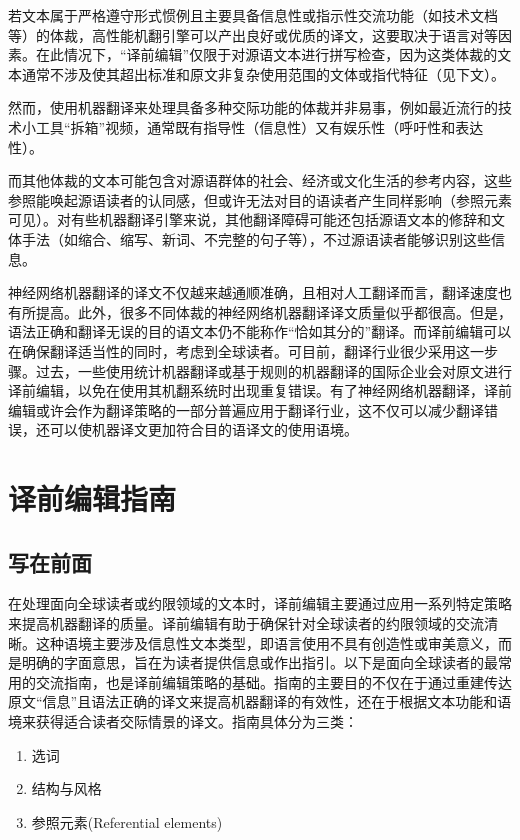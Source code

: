 \documentclass[output=paper,colorlinks,citecolor=brown]{langscibook}
\begin{document}
若文本属于严格遵守形式惯例且主要具备信息性或指示性交流功能（如技术文档等）的体裁，高性能机翻引擎可以产出良好或优质的译文，这要取决于语言对等因素。在此情况下，“译前编辑”仅限于对源语文本进行拼写检查，因为这类体裁的文本通常不涉及使其超出标准和原文非复杂使用范围的文体或指代特征（见下文）。

然而，使用机器翻译来处理具备多种交际功能的体裁并非易事，例如最近流行的技术小工具“拆箱”视频，通常既有指导性（信息性）又有娱乐性（呼吁性和表达性）。

而其他体裁的文本可能包含对源语群体的社会、经济或文化生活的参考内容，这些参照能唤起源语读者的认同感，但或许无法对目的语读者产生同样影响（参照元素可见）。对有些机器翻译引擎来说，其他翻译障碍可能还包括源语文本的修辞和文体手法（如缩合、缩写、新词、不完整的句子等），不过源语读者能够识别这些信息。

神经网络机器翻译的译文不仅越来越通顺准确，且相对人工翻译而言，翻译速度也有所提高。此外，很多不同体裁的神经网络机器翻译译文质量似乎都很高。但是，语法正确和翻译无误的目的语文本仍不能称作“恰如其分的”翻译。而译前编辑可以在确保翻译适当性的同时，考虑到全球读者。可目前，翻译行业很少采用这一步骤。过去，一些使用统计机器翻译或基于规则的机器翻译的国际企业会对原文进行译前编辑，以免在使用其机翻系统时出现重复错误。有了神经网络机器翻译，译前编辑或许会作为翻译策略的一部分普遍应用于翻译行业，这不仅可以减少翻译错误，还可以使机器译文更加符合目的语译文的使用语境。



\section{译前编辑指南}
\subsection{写在前面}

在处理面向全球读者或约限领域的文本时，译前编辑主要通过应用一系列特定策略来提高机器翻译的质量。译前编辑有助于确保针对全球读者的约限领域的交流清晰。这种语境主要涉及信息性文本类型，即语言使用不具有创造性或审美意义，而是明确的字面意思，旨在为读者提供信息或作出指引。以下是面向全球读者的最常用的交流指南，也是译前编辑策略的基础。指南的主要目的不仅在于通过重建传达原文“信息”且语法正确的译文来提高机器翻译的有效性，还在于根据文本功能和语境来获得适合读者交际情景的译文。指南具体分为三类：\largerpage

\begin{enumerate}
\item 选词
\item 结构与风格
\item 参照元素(Referential elements)
\end{enumerate}
\end{document}
